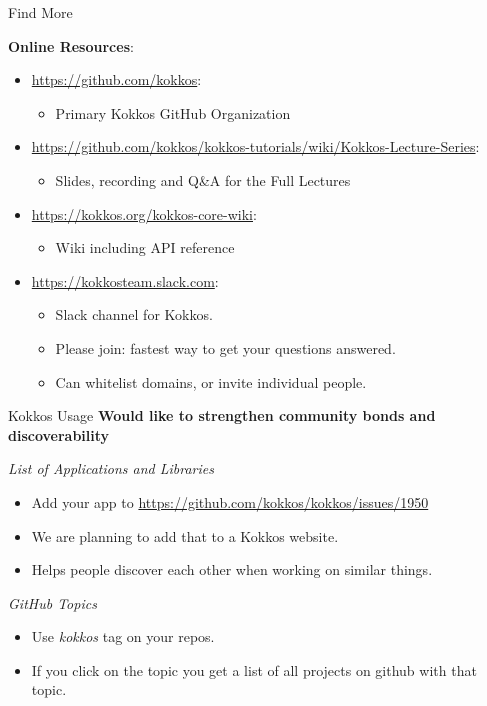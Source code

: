 \begin{frame}{Find More}

\textbf{Online Resources}:

\begin{itemize}
        \item \url{https://github.com/kokkos}:
                \begin{itemize}
                        \item Primary Kokkos GitHub Organization
                \end{itemize}
        \item \url{https://github.com/kokkos/kokkos-tutorials/wiki/Kokkos-Lecture-Series}:
                \begin{itemize}
			\item{Slides, recording and Q\&A for the Full Lectures}
                \end{itemize}
        \item \url{https://kokkos.org/kokkos-core-wiki}:
                \begin{itemize}
                        \item Wiki including API reference
                \end{itemize}
        \item \url{https://kokkosteam.slack.com}:
                \begin{itemize}
                        \item Slack channel for Kokkos.
                        \item Please join: fastest way to get your questions answered.
                        \item Can whitelist domains, or invite individual people.
                \end{itemize}
\end{itemize}

\end{frame}

\begin{frame}[fragile]{Kokkos Usage}
  \textbf{Would like to strengthen community bonds and discoverability}

\vspace{10pt}
\textit{List of Applications and Libraries}
\begin{itemize}
\item Add your app to \url{https://github.com/kokkos/kokkos/issues/1950}
\item We are planning to add that to a Kokkos website.
\item Helps people discover each other when working on similar things.
\end{itemize}

\vspace{10pt}
\textit{GitHub Topics}
\begin{itemize}
\item Use \textit{kokkos} tag on your repos.
\item If you click on the topic you get a list of all projects on github with that topic.
\end{itemize}

\end{frame}


